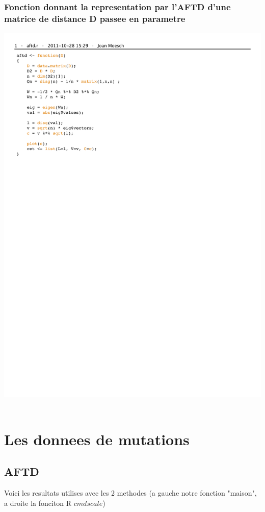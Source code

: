 \documentclass[a4paper,11pt]{article}
\begin{document}
\subsubsection{Fonction donnant la representation par l'AFTD d'une matrice de distance D passee en parametre}
\hspace{2cm}\includegraphics[width=.6\textwidth]{Exo1/aftd.pdf}\\
\\

\section{Les donnees de mutations}

\subsection{AFTD}

\noindent Voici les resultats utilises avec les 2 methodes (a gauche notre fonction "maison", a droite la fonciton R $cmdscale$)
\end{document}
